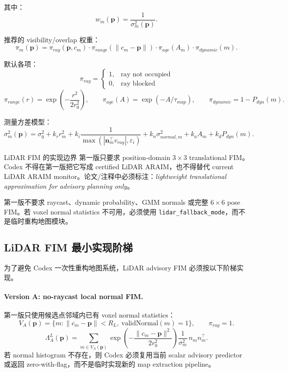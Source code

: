 \documentclass[11pt,a4paper]{article}
\newcommand{\Lam}{\Lambda}
\newcommand{\pvec}{\mathbf{p}}
\newcommand{\nm}{\mathbf{n}}
\newcommand{\eps}{\varepsilon}
\begin{document}
其中：
\[
  w_m(\pvec)=\frac{1}{\sigma_m^2(\pvec)}.
\]

推荐的 visibility/overlap 权重：
\[
  \pi_m(\pvec)=
  \pi_{ray}(\pvec,c_m)\cdot
  \pi_{range}(\|c_m-\pvec\|)\cdot
  \pi_{age}(A_m)\cdot
  \pi_{dynamic}(m).
\]

默认各项：
\[
  \pi_{ray}=
  \begin{cases}1,&\text{ray not occupied}\\ 0,&\text{ray blocked}
  \end{cases}
\]
\[
  \pi_{range}(r)=\exp\left(-\frac{r^2}{2r_0^2}\right),
  \qquad
  \pi_{age}(A)=\exp(-A/\tau_{map}),
  \qquad
  \pi_{dynamic}=1-P_{dyn}(m).
\]

测量方差模型：
\[
  \sigma_m^2(\pvec)
  =
  \sigma_0^2
  +k_r r_m^2
  +k_i\frac{1}{\max(|\nm_m^\top v_{ray}|,\eps_i)}
  +k_n\sigma^2_{normal,m}
  +k_a A_m
  +k_d P_{dyn}(m).
\]

\begin{warningbox}{LiDAR FIM 的实现边界}
  第一版只要求 position-domain $3\times3$ translational FIM。Codex 不得在第一版把它写成 certified LiDAR ARAIM，也不得替代 current LiDAR ARAIM monitor。论文/注释中必须标注：\textit{lightweight translational approximation for advisory planning only}。

  第一版不要求 raycast、dynamic probability、GMM normals 或完整 $6\times6$ pose FIM。若 voxel normal statistics 不可用，必须使用 \texttt{lidar\_fallback\_mode}，而不是临时重构地图模块。
\end{warningbox}


\subsection{LiDAR FIM 最小实现阶梯}

为了避免 Codex 一次性重构地图系统，LiDAR advisory FIM 必须按以下阶梯实现。

\paragraph{Version A: no-raycast local normal FIM.}
第一版只使用候选点邻域内已有 voxel normal statistics：
\[
  V_A(\pvec)=\{m:\|c_m-\pvec\|<R_L,\ \mathrm{validNormal}(m)=1\},
  \qquad \pi_{ray}=1.
\]
\[
  \Lam^L_A(\pvec)=\sum_{m\in V_A(\pvec)}
  \exp\left(-\frac{\|c_m-\pvec\|^2}{2r_0^2}\right)
  \frac{1}{\sigma_m^2}\,n_m n_m^\top.
\]
若 normal histogram 不存在，则 Codex 必须复用当前 scalar advisory predictor 或返回 zero-with-flag，而不是临时实现新的 map extraction pipeline。
\end{document}
